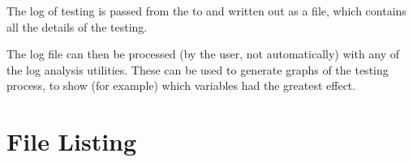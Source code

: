 \documentclass[a4paper, draft]{article}
\begin{document}
The log of testing is passed from the  to 
 and written out as a  file, which 
contains all the details of the testing.

The  log file can then be processed (by the user, not 
automatically) with any of the log analysis utilities. These can be used to 
generate graphs of the testing process, to show (for example) which variables 
had the greatest effect.






\clearpage

\section{File Listing}
\end{document}
